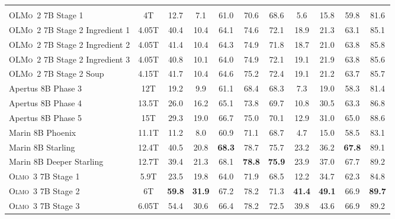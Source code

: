 \documentclass[table]{ai2style/ai2}
\newcommand{\oldOlmo}{OLMo\xspace}
\newcommand{\newOlmo}{Olmo\xspace}
\newcommand{\olmotoo}{\textsc{\oldOlmo~2}\xspace}
\newcommand{\olmothree}{\textsc{\newOlmo~3}\xspace}
\begin{document}
\begin{table}[ht!]
{\begin{center}
\begin{footnotesize}
\begin{tabular}{lc|ccccc|cccc}
\rowcolor{midgrey} \multicolumn{11}{c}{\textbf{7B scale}} \\
\rowcolor{lightgrey}    \olmotoo 7B Stage 1              & 4T & 12.7 & 7.1 & 61.0 & 70.6 & 68.6 & 5.6 & 15.8 & 59.8 & 81.6 \\
\rowcolor{lightgrey}    \olmotoo 7B Stage 2 Ingredient 1 & 4.05T & 40.4 & 10.4 & 64.1 & 74.6 & 72.1 & 18.9 & 21.3 & 63.1 & 85.1 \\
\rowcolor{lightgrey}    \olmotoo 7B Stage 2 Ingredient 2 & 4.05T & 41.4 & 10.4 & 64.3 & 74.9 & 71.8 & 18.7 & 21.0 & 63.8 & 85.8 \\
\rowcolor{lightgrey}    \olmotoo 7B Stage 2 Ingredient 3 & 4.05T & 40.8 & 10.1 & 64.0 & 74.9 & 72.1 & 19.1 & 21.9 & 63.8 & 85.6 \\
\rowcolor{lightgrey}    \olmotoo 7B Stage 2 Soup         & 4.15T & 41.7 & 10.4 & 64.6 & 75.2 & 72.4 & 19.1 & 21.2 & 63.7 & 85.7 \\
\rowcolor{lightgrey}    Apertus 8B Phase 3               & 12T & 19.2 & 9.9 & 61.1 & 68.4 & 68.3 & 7.3 & 19.0 & 58.3 & 81.4 \\
\rowcolor{lightgrey}    Apertus 8B Phase 4               & 13.5T & 26.0 & 16.2 & 65.1 & 73.8 & 69.7 & 10.8 & 30.5 & 63.3 & 86.8 \\
\rowcolor{lightgrey}    Apertus 8B Phase 5               & 15T & 29.3 & 19.0 & 66.7 & 75.0 & 70.1 & 12.9 & 31.0 & 65.0 & 88.6 \\
\rowcolor{lightgrey}    Marin 8B Phoenix                 & 11.1T & 11.2 & 8.0 & 60.9 & 71.1 & 68.7 & 4.7 & 15.0 & 58.5 & 83.1 \\
\rowcolor{lightgrey}    Marin 8B Starling                & 12.4T & 40.5 & 20.8 & {\bf{68.3}} & 78.7 & 75.7 & 23.2 & 36.2 & {\bf{67.8}} & 89.1 \\
\rowcolor{lightgrey}    Marin 8B Deeper Starling         & 12.7T & 39.4 & 21.3 & 68.1 & {\bf{78.8}} & {\bf{75.9}} & 23.9 & 37.0 & 67.7 & 89.2 \\
\rowcolor{ai2lightpink} \olmothree 7B Stage 1            & 5.9T & 23.5 & 19.8 & 64.0 & 71.9 & 68.5 & 12.2 & 34.7 & 62.3 & 84.8 \\
\rowcolor{ai2lightpink} \olmothree 7B Stage 2            & 6T & {\bf{59.8}} & {\bf{31.9}} & 67.2 & 78.2 & 71.3 & {\bf{41.4}} & {\bf{49.1}} & 66.9 & {\bf{89.7}} \\
\rowcolor{ai2lightpink} \olmothree 7B Stage 3            & 6.05T & 54.4 & 30.6 & 66.4 & 78.2 & 72.5 & 39.8 & 43.6 & 66.9 & 89.2 \\


\end{tabular}
\end{footnotesize}
\end{center}}
\end{table}
\end{document}
